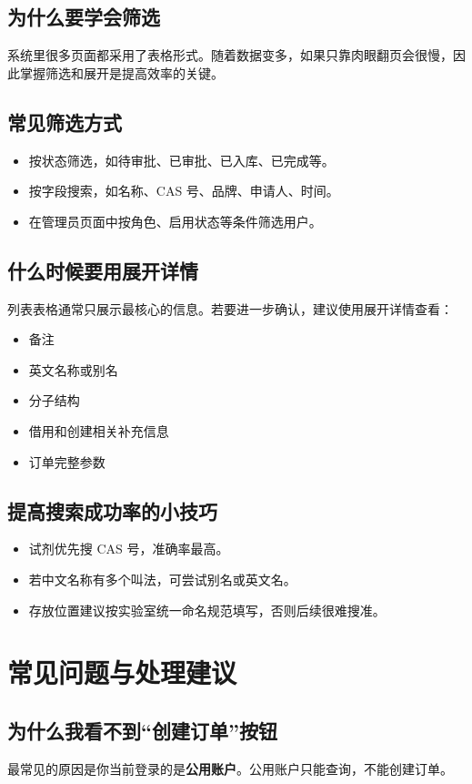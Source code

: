 \documentclass[12pt,a4paper]{ctexart}
\begin{document}
\subsection{为什么要学会筛选}
系统里很多页面都采用了表格形式。随着数据变多，如果只靠肉眼翻页会很慢，因此掌握筛选和展开是提高效率的关键。

\subsection{常见筛选方式}
\begin{itemize}
  \item 按状态筛选，如待审批、已审批、已入库、已完成等。
  \item 按字段搜索，如名称、CAS 号、品牌、申请人、时间。
  \item 在管理员页面中按角色、启用状态等条件筛选用户。
\end{itemize}

\subsection{什么时候要用展开详情}
列表表格通常只展示最核心的信息。若要进一步确认，建议使用展开详情查看：
\begin{itemize}
  \item 备注
  \item 英文名称或别名
  \item 分子结构
  \item 借用和创建相关补充信息
  \item 订单完整参数
\end{itemize}

\subsection{提高搜索成功率的小技巧}
\begin{itemize}
  \item 试剂优先搜 CAS 号，准确率最高。
  \item 若中文名称有多个叫法，可尝试别名或英文名。
  \item 存放位置建议按实验室统一命名规范填写，否则后续很难搜准。
\end{itemize}

\newpage
\section{常见问题与处理建议}

\subsection{为什么我看不到“创建订单”按钮}
最常见的原因是你当前登录的是\textbf{公用账户}。公用账户只能查询，不能创建订单。
\end{document}
